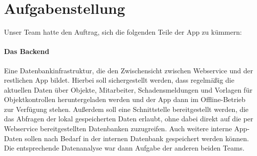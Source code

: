 \documentclass[12pt]{article}
\begin{document}
\begin{abstract}
Im Folgenden geht es um die Implementierung einer Hausmeister-App, von uns FacilityManager getauft, mit der Schadensmeldungen verfasst und abgeschickt, Objektkontrollen anhand von Checklisten durchgeführt und dokumentiert und Informationen über Objekte abgerufen werden können.
\paragraph{Fachlicher Aspekt}
Zu dieser App existierte anfangs bereits ein Prototyp, neu ist allerdings die Zusammenführung aller Funktionen in einer Anwendung und die Möglichkeit, Objektkontrollen mithilfe der App durchzuführen. Außerdem war vorgegeben, dass die neue Auflage der Hausmeister-App auch offline funktioniert, was durch eine interne Wrapper-Datenbank für die per RESTful-Webservice erreichbare bereits vorhandene Datenbank realisiert werden sollte. Mehr dazu in Abschnitt \ref{sec:aufg}.
\paragraph{Technologie}
Damit die App auf möglichst vielen Plattformen läuft, haben wir uns am Anfang des Projekts für die Umsetzung mit dem Ionic-Framework entschieden. Dieses ermöglichte uns ein Arbeiten auf hohem Abstraktionsniveau bei gleichzeitigem Handhaben der Implementierung auf Android, iOS, als Web-App, Electron-App, etc.
\paragraph{Organisation}
Zu Beginn wurde das Projekt auf drei Arbeitsteams aufgeteilt, ein Team für das Backend, ein Team für den Schadensmeldungsteil der GUI und ein Team für den Objektkontrollenteil der GUI. Hier soll es um den Beitrag des ersten dieser Teams gehen.
\end{abstract}

\section{Aufgabenstellung}\label{sec:aufg} 
Unser Team hatte den Auftrag, sich die folgenden Teile der App zu kümmern:
\paragraph{Das Backend} Eine Datenbankinfrastruktur, die den Zwischensicht zwischen Webservice und der restlichen App bildet. Hierbei soll sichergestellt werden, dass regelmäßig die aktuellen Daten über Objekte, Mitarbeiter, Schadensmeldungen und Vorlagen für Objektkontrollen heruntergeladen werden und der App dann im Offline-Betrieb zur Verfügung stehen. Außerdem soll eine Schnittstelle bereitgestellt werden, die das Abfragen der lokal gespeicherten Daten erlaubt, ohne dabei direkt auf die per Webservice bereitgestellten Datenbanken zuzugreifen. Auch weitere interne App-Daten sollen nach Bedarf in der internen Datenbank gespeichert werden können. Die entsprechende Datenanalyse war dann Aufgabe der anderen beiden Teams.
\end{document}
